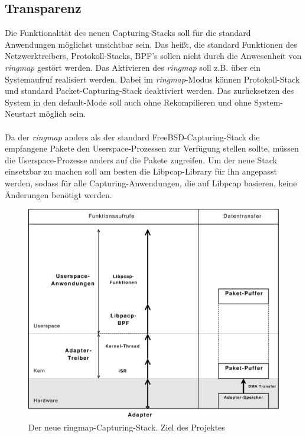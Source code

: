 \subsection{Transparenz}
Die Funktionalität des neuen Capturing-Stacks soll für die standard Anwendungen
möglichst unsichtbar sein. Das heißt, die standard Funktionen des
Netzwerktreibers, Protokoll-Stacks, BPF's sollen nicht durch die Anwesenheit
von \emph{ringmap} gestört werden. Das Aktivieren des \emph{ringmap} soll z.B.
über ein Systemaufruf realisiert werden. Dabei im \emph{ringmap}-Modus können
Protokoll-Stack und standard Packet-Capturing-Stack deaktiviert werden. Das
zurücksetzen des System in den default-Mode soll auch ohne Rekompilieren und
ohne System-Neustart möglich sein.\\\\
%
Da der \emph{ringmap} anders als der standard FreeBSD-Capturing-Stack die
empfangene Pakete den Userspace-Prozessen zur Verfügung stellen sollte, müssen
die Userspace-Prozesse anders auf die Pakete zugreifen. Um der neue Stack
einsetzbar zu machen soll am besten die Libpcap-Library für ihn angepasst
werden, sodass für alle Capturing-Anwendungen, die auf Libpcap basieren, keine
Änderungen benötigt werden. 

\begin{figure}
	\begin{center}
	\includegraphics[width=4.9in]{bilder/1copy}
	\end{center}
	\caption{Der neue ringmap-Capturing-Stack. Ziel des Projektes}
	\label{img:new_stack}
\end{figure}

